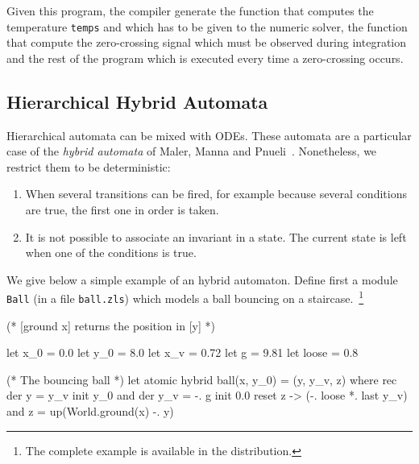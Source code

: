 \documentclass[11pt,titlepage,twoside]{report}
\begin{document}
Given this program, the compiler generate the function that computes
the temperature \verb-temps- and which has to be given to the numeric solver,
the function that compute the zero-crossing signal which must be observed
during integration and the rest of the program which is executed every time
a zero-crossing occurs.



\subsection{Hierarchical Hybrid Automata} %

Hierarchical automata can be mixed with ODEs. These automata are a
particular case of the \emph{hybrid automata} of Maler, Manna and
Pnueli~\cite{MalerMannaPnueli:hybrid92}. Nonetheless, we restrict them
to be deterministic:
\begin{enumerate}
  \item When several transitions can be fired, for
    example because several conditions are true, the first one in order is
    taken.
  \item It is not possible to associate an invariant in a state. The current
    state is left when one of the conditions is true.
\end{enumerate}

We give below a simple example of an hybrid automaton. Define first
a module \texttt{Ball} (in a file \texttt{ball.zls}) which models a ball bouncing
on a staircase.~\footnote{The complete example is available in the distribution.}

\begin{runverbatim}[withresult]
(* [ground x] returns the position in [y] *)

let x_0 = 0.0
let y_0 = 8.0
let x_v = 0.72
let g = 9.81
let loose = 0.8

(* The bouncing ball *)
let atomic hybrid ball(x, y_0) = (y, y_v, z) where
  rec der y = y_v init y_0
  and der y_v = -. g init 0.0 reset z -> (-. loose *. last y_v)
  and z = up(World.ground(x) -. y)
\end{runverbatim}
\end{document}
